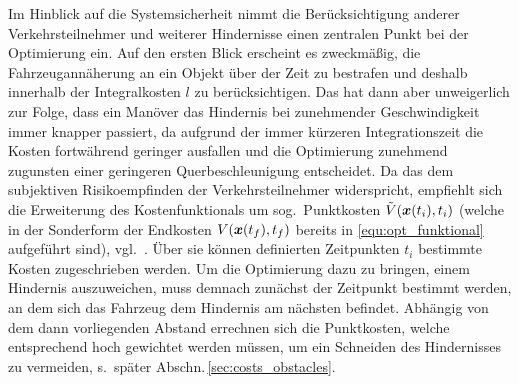 Im Hinblick auf die Systemsicherheit nimmt die Berücksichtigung anderer Verkehrsteilnehmer und weiterer Hindernisse einen zentralen Punkt bei der Optimierung ein. Auf den ersten Blick erscheint es zweckmäßig, die Fahrzeugannäherung an ein Objekt über der Zeit zu bestrafen und deshalb innerhalb der Integralkosten $l$ zu berücksichtigen. Das hat dann aber unweigerlich zur Folge, dass ein Manöver das Hindernis bei zunehmender Geschwindigkeit immer knapper passiert, da aufgrund der immer kürzeren Integrationszeit die Kosten fortwährend geringer ausfallen und die Optimierung zunehmend zugunsten einer geringeren Querbeschleunigung entscheidet. Da das dem subjektiven Risikoempfinden der Verkehrsteilnehmer widerspricht, empfiehlt sich die Erweiterung des Kostenfunktionals um sog.\ Punktkosten $\tilde V(\boldsymbol{x}(t_i),t_i)$ (welche in der Sonderform der Endkosten $V(\boldsymbol{x}(t_f),t_f)$ bereits in \eqref{equ:opt_funktional} aufgeführt sind), vgl.\ \cite{Liu2010}. Über sie können definierten Zeitpunkten $t_i$ bestimmte Kosten zugeschrieben werden. Um die Optimierung dazu zu bringen, einem Hindernis auszuweichen, muss demnach zunächst der Zeitpunkt bestimmt werden, an dem sich das Fahrzeug dem Hindernis am nächsten befindet. Abhängig von dem dann vorliegenden Abstand errechnen sich die Punktkosten, welche entsprechend hoch gewichtet werden müssen, um ein Schneiden des Hindernisses zu vermeiden, s.\ später Abschn.\,\ref{sec:costs_obstacles}.











